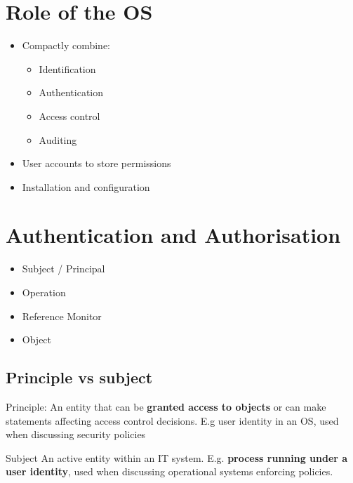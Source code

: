 \documentclass{article}
\begin{document}
\tableofcontents

\newpage

\section{Role of the OS}
\begin{itemize}
  \item Compactly combine: 
  \begin{itemize}
    \item Identification 
    \item Authentication 
    \item Access control 
    \item Auditing
  \end{itemize} 
  \item User accounts to store permissions 
  \item Installation and configuration
\end{itemize}

\section{Authentication and Authorisation}
\begin{itemize}
  \item Subject / Principal
  \item Operation
  \item Reference Monitor
  \item Object
\end{itemize}

\subsection{Principle vs subject}
\begin{flushleft}
Principle: An entity that can be \textbf{granted access to objects} or can make statements affecting access control decisions. E.g user identity in an OS, used when discussing security policies
\end{flushleft}
\begin{flushleft}
Subject An active entity within an IT system. E.g. \textbf{process running under a user identity}, used when discussing operational systems enforcing policies.
\end{flushleft}
\end{document}
